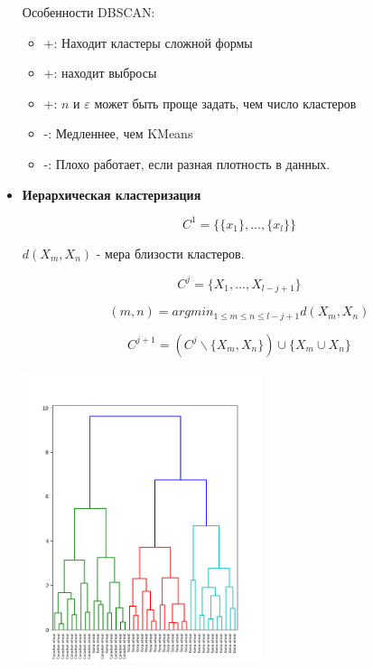 \documentclass[a4paper]{article}
\begin{document}
\begin{itemize}
Особенности DBSCAN:
\begin{itemize}
\item +: Находит кластеры сложной формы
\item +: находит выбросы
\item +: $n$ и $\varepsilon$ может быть проще задать, чем число кластеров
\item -: Медленнее, чем KMeans
\item -: Плохо работает, если разная плотность в данных.
\end{itemize}

\item \textbf{Иерархическая кластеризация}

\[ C^1 = \{ \{ x_1 \}, ..., \{ x_l \} \} \]

$d(X_m, X_n)$ - мера близости кластеров.

\[ C^j = \{ X_1,  ..., X_{l-j+1} \} \]

\[ (m, n) = argmin_{1 \leq m \leq n \leq l-j+1} d(X_m, X_n) \]

\[ C^{j+1} = \left( C^j \backslash \{ X_m, X_n \} \right) \cup \{ X_m \cup X_n \} \]

\includegraphics[width=7cm]{clasterization.png}
\end{itemize}
\end{document}
